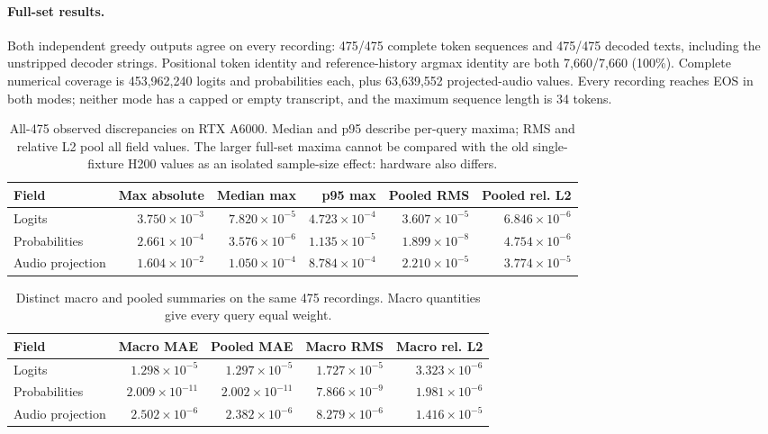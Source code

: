 \paragraph{Full-set results.} Both independent greedy outputs agree on every recording: 475/475 complete token sequences and 475/475 decoded texts, including the unstripped decoder strings. Positional token identity and reference-history argmax identity are both 7,660/7,660 (100\%). Complete numerical coverage is 453,962,240 logits and probabilities each, plus 63,639,552 projected-audio values. Every recording reaches EOS in both modes; neither mode has a capped or empty transcript, and the maximum sequence length is 34 tokens.

\begin{table}[h]
\centering
\small
\caption{All-475 observed discrepancies on RTX A6000. Median and p95 describe per-query maxima; RMS and relative L2 pool all field values. The larger full-set maxima cannot be compared with the old single-fixture H200 values as an isolated sample-size effect: hardware also differs.}
\label{tab:asr-full-error}
\begin{tabular}{lrrrrr}
\toprule
Field & Max absolute & Median max & p95 max & Pooled RMS & Pooled rel. L2\\
\midrule
Logits & $3.750\times10^{-3}$ & $7.820\times10^{-5}$ & $4.723\times10^{-4}$ & $3.607\times10^{-5}$ & $6.846\times10^{-6}$\\
Probabilities & $2.661\times10^{-4}$ & $3.576\times10^{-6}$ & $1.135\times10^{-5}$ & $1.899\times10^{-8}$ & $4.754\times10^{-6}$\\
Audio projection & $1.604\times10^{-2}$ & $1.050\times10^{-4}$ & $8.784\times10^{-4}$ & $2.210\times10^{-5}$ & $3.774\times10^{-5}$\\
\bottomrule
\end{tabular}
\end{table}

\begin{table}[h]
\centering
\small
\caption{Distinct macro and pooled summaries on the same 475 recordings. Macro quantities give every query equal weight.}
\begin{tabular}{lrrrr}
\toprule
Field & Macro MAE & Pooled MAE & Macro RMS & Macro rel. L2\\
\midrule
Logits & $1.298\times10^{-5}$ & $1.297\times10^{-5}$ & $1.727\times10^{-5}$ & $3.323\times10^{-6}$\\
Probabilities & $2.009\times10^{-11}$ & $2.002\times10^{-11}$ & $7.866\times10^{-9}$ & $1.981\times10^{-6}$\\
Audio projection & $2.502\times10^{-6}$ & $2.382\times10^{-6}$ & $8.279\times10^{-6}$ & $1.416\times10^{-5}$\\
\bottomrule
\end{tabular}
\end{table}

